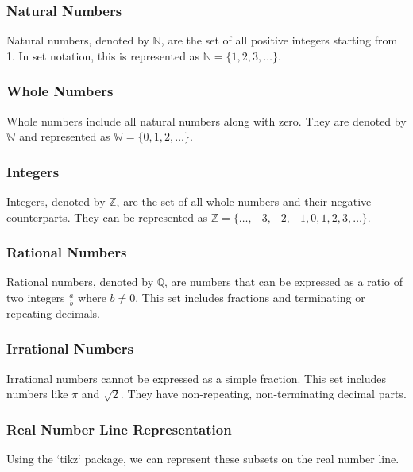 \documentclass[a4paper,12pt]{book}
\begin{document}
\subsubsection{Natural Numbers}
Natural numbers, denoted by \( \mathbb{N} \), are the set of all positive integers starting from 1. In set notation, this is represented as \( \mathbb{N} = \{1, 2, 3, \ldots\} \).


\subsubsection{Whole Numbers}
Whole numbers include all natural numbers along with zero. They are denoted by \( \mathbb{W} \) and represented as \( \mathbb{W} = \{0, 1, 2, \ldots\} \).


\subsubsection{Integers}
Integers, denoted by \( \mathbb{Z} \), are the set of all whole numbers and their negative counterparts. They can be represented as \( \mathbb{Z} = \{\ldots, -3, -2, -1, 0, 1, 2, 3, \ldots\} \).


\subsubsection{Rational Numbers}
Rational numbers, denoted by \( \mathbb{Q} \), are numbers that can be expressed as a ratio of two integers \( \frac{a}{b} \) where \( b \neq 0 \). This set includes fractions and terminating or repeating decimals.


\subsubsection{Irrational Numbers}
Irrational numbers cannot be expressed as a simple fraction. This set includes numbers like \( \pi \) and \( \sqrt{2} \). They have non-repeating, non-terminating decimal parts.


\subsubsection{Real Number Line Representation}
Using the `tikz` package, we can represent these subsets on the real number line.


\begin{center}
\end{center}
\end{document}
